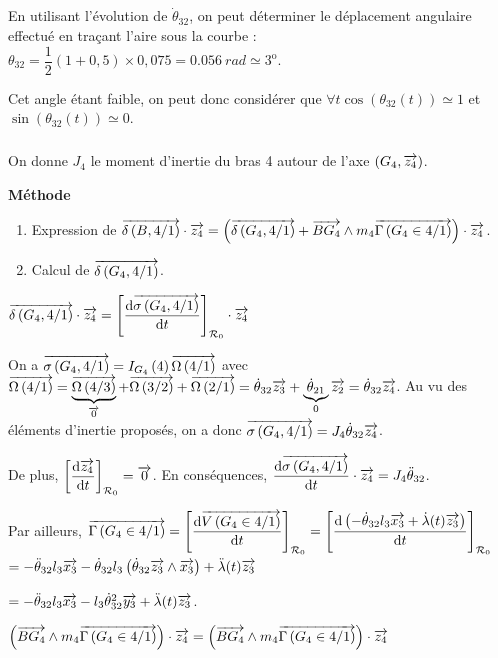 \documentclass[10pt,fleqn]{article} %
\begin{document}
\subparagraph{}%
En utilisant l'évolution de $\dot{\theta}_{32}$, on peut déterminer le déplacement angulaire effectué en traçant l'aire sous la courbe :
$\theta_{32}=\dfrac{1}{2}\left( 1+0,5\right)\times 0,075 =\SI{0,056}{rad}\simeq 3^{\text{o}}$.

Cet angle étant faible, on peut donc considérer que $\forall t \cos \left(\theta_{32}(t)\right)\simeq 1$ et $\sin\left(\theta_{32}(t)\right)\simeq 0$.

\subparagraph{}%

On donne $J_4$ le moment d'inertie du bras 4 autour de l'axe $\left(G_4,\overrightarrow{z_4}\right)$.

\textbf{Méthode}
\begin{enumerate}
\item Expression de $\overrightarrow{\delta \left( {B}, {4} /{1}\right)}\cdot\overrightarrow{z_4} = \left( \overrightarrow{\delta \left( {G_4}, {4} /{1}\right)} + \overrightarrow{BG_4}\wedge m_4 \overrightarrow{\Gamma \left( {G_4} \in {4}/{1}\right)}\right)\cdot\overrightarrow{z_4}$.
\item Calcul de $\overrightarrow{\delta \left( {G_4}, {4} /{1}\right)}$.
\end{enumerate}

$\overrightarrow{\delta \left( {G_4}, {4} /{1}\right)} \cdot\overrightarrow{z_4} = \left[ \dfrac{\text{d} \overrightarrow{\sigma \left( {G_4}, {4} /{1}\right)}}{\text{d} t} \right]_{\mathcal{R}_{0}}\cdot\overrightarrow{z_4}$

On a $\overrightarrow{\sigma \left( {G_4}, {4} /{1}\right)} =I_{G_4}\left( 4\right) \overrightarrow{\Omega\left( {4}/{1}\right)}$ avec $\overrightarrow{\Omega\left( {4}/{1}\right)}=\underbrace{\overrightarrow{\Omega\left( {4}/{3}\right)}}_{\overrightarrow{0}}+\overrightarrow{\Omega\left( {3}/{2}\right)}+\overrightarrow{\Omega\left( {2}/{1}\right)} =\dot{\theta}_{32} \overrightarrow{z_3}+\underbrace{\dot{\theta}_{21}}_{0} \overrightarrow{z_2}=\dot{\theta}_{32} \overrightarrow{z_4}$. Au vu des éléments d'inertie proposés, on a donc 
$\overrightarrow{\sigma \left( {G_4}, {4} /{1}\right)}=J_4\dot{\theta}_{32} \overrightarrow{z_4}$.

De plus, $ \left[ \dfrac{ \text{d} \overrightarrow{z_4}}{\text{d} t} \right]_{\mathcal{R}_{0}} = \overrightarrow{0} $. 
En conséquences, $\dfrac{\text{d} \overrightarrow{\sigma \left( {G_4}, {4} /{1}\right)}}{\text{d} t} \cdot\overrightarrow{z_4} = J_4\ddot{\theta}_{32}$.

Par ailleurs, $\overrightarrow{\Gamma \left( {G_4} \in {4}/{1}\right)}= \left[\dfrac{\text{d} \overrightarrow{V\left( {G_4} \in {4}/{1}\right)}}{\text{d} t} \right]_{\mathcal{R}_{0}}=\left[\dfrac{\text{d} \left( -\dot{\theta}_{32}l_3\overrightarrow{x_3}  + \dot{\lambda}(t)\overrightarrow{z_3} \right)}{\text{d} t} \right]_{\mathcal{R}_{0}}$
$= -\ddot{\theta}_{32}l_3\overrightarrow{x_3} -\dot{\theta}_{32}l_3    \left(\dot{\theta}_{32} \overrightarrow{z_3}\wedge \overrightarrow{x_3} \right)  + \ddot{\lambda}(t)\overrightarrow{z_3}  $

$= -\ddot{\theta}_{32}l_3\overrightarrow{x_3} -l_3   \dot{\theta}_{32}^2  \overrightarrow{y_3} + \ddot{\lambda}(t)\overrightarrow{z_3}  $.

$\left(\overrightarrow{BG_4}\wedge m_4 \overrightarrow{\Gamma \left( {G_4} \in {4}/{1}\right)}\right)\cdot\overrightarrow{z_4} = 
\left(\overrightarrow{BG_4}\wedge m_4 \overrightarrow{\Gamma \left( {G_4} \in {4}/{1}\right)}\right)\cdot\overrightarrow{z_4} $
\end{document}
